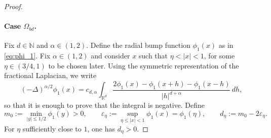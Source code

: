 \documentclass[11pt,handout]{article}%
\numberwithin{equation}{section}
\theoremstyle{definition}
\begin{document}
\begin{proof}
	\paragraph{Case $\Omega_{bd}$.} 
	Fix $d\in\mathbb{N}$ and $\alpha\in(1,2)$. Define the radial bump function $\phi_1(x)$ as in \eqref{eq:phi_1}. 	 
	Fix $\alpha\in(1,2)$ and consider $x$ such that $\eta<|x|<1$, for some $\eta\in(3/4,1)$ to be chosen later. Using the symmetric representation of the fractional Laplacian, we write
	\begin{equation*}
		(-\Delta)^{\alpha/2}\phi_1(x)
		= c_{d,\alpha}\int_{\mathbb{R}^d}\frac{2\phi_1(x)-\phi_1(x+h)-\phi_1(x-h)}{|h|^{d+\alpha}}\,dh,
	\end{equation*}
	so that it is enough to prove that the integral is negative.
	Define 
	\[
	m_0 := \min_{|y|\le 1/2}\phi_1(y)>0, 
	\qquad 
	\varepsilon_\eta := \sup_{\eta\le |x|<1}\phi_1(x)=\phi_1(\eta),
	\qquad 
	d_\eta := m_0-2\varepsilon_\eta.
	\]
	For $\eta$ sufficiently close to $1$, one has $d_\eta>0$.
	

\end{proof}
\end{document}

